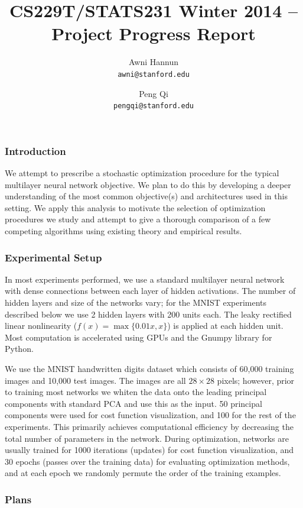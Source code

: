 \documentclass[12pt,english]{article}
\title{
{\large CS229T/STATS231 Winter 2014 -- Project Progress Report }
}
\author{ \large
Awni Hannun \\
\texttt{awni@stanford.edu}
\and
Peng Qi \\
\texttt{pengqi@stanford.edu}
}
\date{}
\newcommand{\1}{\mathbb{I}} %
\begin{document}
\maketitle

\subsubsection*{Introduction}
We attempt to prescribe a stochastic optimization procedure for the typical
multilayer neural network objective. We plan to do this by developing a deeper
understanding of the most common objective(s) and architectures used in this
setting. We apply this analysis to motivate the selection of optimization
procedures we study and attempt to give a thorough comparison of a few
competing algorithms using existing theory and empirical results. 

\subsubsection*{Experimental Setup}

In most experiments performed, we use a standard multilayer neural network with
dense connections between each layer of hidden activations. The number of
hidden layers and size of the networks vary; for the MNIST experiments
described below we use 2 hidden layers with 200 units each. The leaky rectified
linear nonlinearity ($f(x) = \max\{0.01x,x\}$) is applied at each hidden unit.
Most computation is accelerated using GPUs and the Gnumpy library for Python. 

We use the MNIST handwritten digits dataset which consists of 60,000 training
images and 10,000 test images. The images are all $28\times28$ pixels; however,
prior to training most networks we whiten the data onto the leading principal
components with standard PCA and use this as the input.
50 principal components were used for cost function visualization, and 100 
for the rest of the experiments. This primarily achieves
computational efficiency by decreasing the total number of parameters in the
network. During optimization, networks are usually trained for 1000 iterations (updates) for
 cost function visualization, and 30 epochs
(passes over the training data) for evaluating optimization methods, and at each epoch we
 randomly permute the
order of the training examples.




\subsubsection*{Plans}
\end{document}
